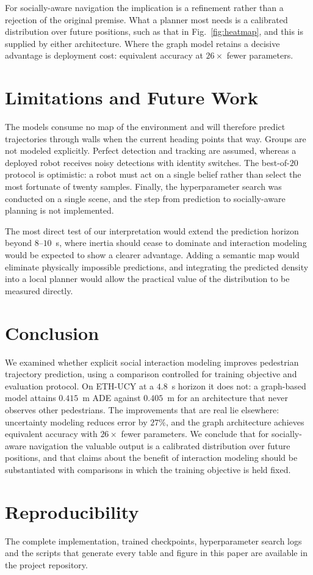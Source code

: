 \documentclass[conference]{IEEEtran}
\begin{document}
For socially-aware navigation the implication is a refinement rather than a rejection of
the original premise. What a planner most needs is a calibrated distribution over future
positions, such as that in Fig.~\ref{fig:heatmap}, and this is supplied by either
architecture. Where the graph model retains a decisive advantage is deployment cost:
equivalent accuracy at $26\times$ fewer parameters.

\section{Limitations and Future Work}

The models consume no map of the environment and will therefore predict trajectories
through walls when the current heading points that way. Groups are not modeled explicitly.
Perfect detection and tracking are assumed, whereas a deployed robot receives noisy
detections with identity switches. The best-of-$20$ protocol is optimistic: a robot must
act on a single belief rather than select the most fortunate of twenty samples. Finally,
the hyperparameter search was conducted on a single scene, and the step from prediction to
socially-aware planning is not implemented.

The most direct test of our interpretation would extend the prediction horizon beyond
$8$--$10$~s, where inertia should cease to dominate and interaction modeling would be
expected to show a clearer advantage. Adding a semantic map would eliminate physically
impossible predictions, and integrating the predicted density into a local planner would
allow the practical value of the distribution to be measured directly.

\section{Conclusion}

We examined whether explicit social interaction modeling improves pedestrian trajectory
prediction, using a comparison controlled for training objective and evaluation protocol.
On ETH-UCY at a $4.8$~s horizon it does not: a graph-based model attains $0.415$~m ADE
against $0.405$~m for an architecture that never observes other pedestrians. The
improvements that are real lie elsewhere: uncertainty modeling reduces error by $27\%$,
and the graph architecture achieves equivalent accuracy with $26\times$ fewer parameters.
We conclude that for socially-aware navigation the valuable output is a calibrated
distribution over future positions, and that claims about the benefit of interaction
modeling should be substantiated with comparisons in which the training objective is held
fixed.

\section*{Reproducibility}

The complete implementation, trained checkpoints, hyperparameter search logs and the
scripts that generate every table and figure in this paper are available in the project
repository.



\end{document}
